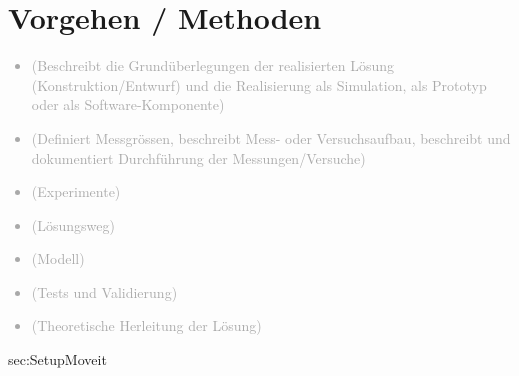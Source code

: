 \chapter{Vorgehen / Methoden}
\label{sec:VorgehenMethoden}


\textcolor{darkgray}{
  \begin{itemize}
  \item (Beschreibt die Grundüberlegungen der realisierten Lösung (Konstruktion/Entwurf) und die Realisierung als Simulation, als Prototyp oder als Software-Komponente)
  \item (Definiert Messgrössen, beschreibt Mess- oder Versuchsaufbau, beschreibt und dokumentiert Durchführung der Messungen/Versuche)
  \item (Experimente)
  \item (Lösungsweg)
  \item (Modell)
  \item (Tests und Validierung)
  \item (Theoretische Herleitung der Lösung)
  \end{itemize}
}



sec:SetupMoveit